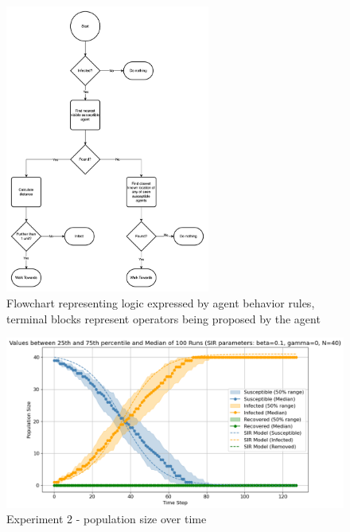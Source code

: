 \begin{figure}[H]
    \centering
    \includegraphics[width=0.6\textwidth]{images/chapter2/sir_logic2.drawio.png}
    \caption{Flowchart representing logic expressed by agent behavior rules, terminal blocks represent operators being proposed by the agent}\label{fig:sir_logic2.drawio.png}
\end{figure}



\begin{figure}[H]
    \centering
    \includegraphics[width=1.0\textwidth]{images/chapter2/experiment2.png}
    \caption{Experiment 2 - population size over time}\label{fig:images/chapter2/experiment2.png}
\end{figure}

